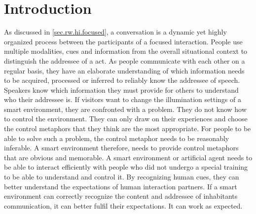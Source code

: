 \section{Introduction}
As discussed in \cref{sec.rw.hi.focused}, a \gls{conversation} is a dynamic yet highly organized process between the participants of a \gls{focused interaction}.
People use multiple modalities,  cues and information from the overall situational context to distinguish the \gls{addressee} of a  act.
As people communicate with each other on a regular basis, they have an elaborate understanding of which information needs to be acquired, processed or inferred to reliably know the \gls{addressee} of speech.
Speakers know which information they must provide for others to understand who their \gls{addressee} is.
If visitors want to change the illumination settings of a \gls{smart environment}, they are confronted with a problem.
They do not know how to control the environment.
They can only draw on their experiences and choose the control metaphors that they think are the most appropriate.
For people to be able to solve such a problem, the control metaphor needs to be reasonably inferable.
A \gls{smart environment} therefore, needs to provide control metaphors that are obvious and memorable.
A \gls{smart environment} or \gls{artificial agent} needs to be able to interact efficiently with people who did not undergo a special training to be able to understand and control it.
By recognizing human  cues, they can better understand the expectations of human interaction partners.
If a \gls{smart environment} can correctly recognize the content and \gls{addressee} of \naive{} inhabitants communication, it can better fulfil their expectations.
It can work as expected.

